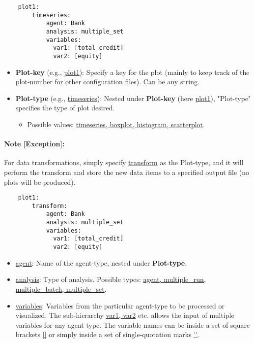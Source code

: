 \documentclass[10pt,a4paper]{article}
\begin{document}
\begin{lstlisting}
    plot1:
        timeseries:
            agent: Bank
            analysis: multiple_set
            variables: 
              var1: [total_credit]  
              var2: [equity]
\end{lstlisting}    
 
\begin{itemize}
    \item \textbf{Plot-key} (e.g., \url{plot1}): Specify a key for the plot (mainly to keep track of the plot-number for other configuration files). Can be any string.
    \item \textbf{Plot-type} (e.g., \url{timeseries}): Nested under \textbf{Plot-key} (here \url{plot1}), "Plot-type" specifies the type of plot desired.
	\begin{itemize}
		\item Possible values: \url{timeseries, boxplot, histogram, scatterplot}.
	\end{itemize}
\end{itemize}

\paragraph{Note [Exception]:} For data transformations, simply specify \url{transform} as the Plot-type, and it will perform the transform and store the new data items to a specified output file (no plots will be produced). 
\begin{lstlisting}
    plot1:
        transform:
            agent: Bank
            analysis: multiple_set
            variables: 
              var1: [total_credit]  
              var2: [equity]
\end{lstlisting}    

\begin{itemize}
    \item \url{agent}: Name of the agent-type, nested under \textbf{Plot-type}.

    \item \url{analysis}: Type of analysis. Possible types:  \url{agent, multiple_run, multiple_batch, multiple_set}.

    \item \url{variables}: Variables from the particular agent-type to be processed or visualized. The sub-hierarchy \url{var1, var2} etc. allows the input of multiple variables for any agent type.
    The variable names can be inside a set of square brackets \url{[]} or simply inside a set of single-quotation marks \url{''}.
\end{itemize}
\end{document}
